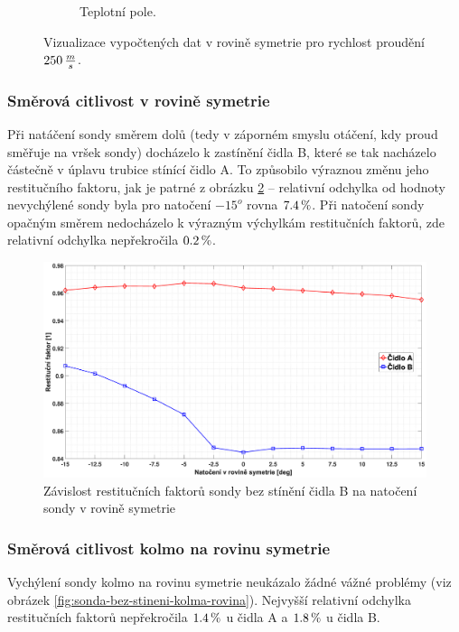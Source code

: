 \begin{figure}[ht!]
\begin{subfigure}{0.45\textwidth}
                    \caption{Teplotní pole.}
                \end{subfigure}
                \caption{Vizualizace vypočtených dat v rovině symetrie pro rychlost proudění $250 \, \frac{m}{s}$.}
                \label{fig:sonda-bez-stineni-vizualizace}
            \end{figure}


        \newpage
        \subsubsection{Směrová citlivost v rovině symetrie}
            Při natáčení sondy směrem dolů (tedy v záporném smyslu otáčení, kdy proud směřuje na vršek sondy) docházelo k zastínění čidla B, které se tak nacházelo částečně v úplavu trubice stínící čidlo A. To způsobilo výraznou změnu jeho restitučního faktoru, jak je patrné z obrázku \ref{fig:sonda-bez-stineni-rovina-symetrie} – relativní odchylka od hodnoty nevychýlené sondy byla pro natočení $-15^o$ rovna $7.4 \, \%$. Při natočení sondy opačným směrem nedocházelo k výrazným výchylkám restitučních faktorů, zde relativní odchylka nepřekročila $0.2 \, \%$.
            
            \begin{figure}[ht!]
                \centering
                \includegraphics*[width=\textwidth, trim={5.9cm 1.0cm 5.8cm 2.0cm}]{400_SIMULACE_KONSTRUKCNICH_UPRAV/Grafy/01_rovina_symetrie}
                \caption{Závislost restitučních faktorů sondy bez stínění čidla B na natočení sondy v rovině symetrie}
                \label{fig:sonda-bez-stineni-rovina-symetrie}
            \end{figure}
        \subsubsection{Směrová citlivost kolmo na rovinu symetrie}
            Vychýlení sondy kolmo na rovinu symetrie neukázalo žádné vážné problémy (viz obrázek \ref{fig:sonda-bez-stineni-kolma-rovina}). Nejvyšší relativní odchylka restitučních faktorů nepřekročila $1.4 \, \%$ u čidla A a $1.8 \, \%$ u čidla B.
            
